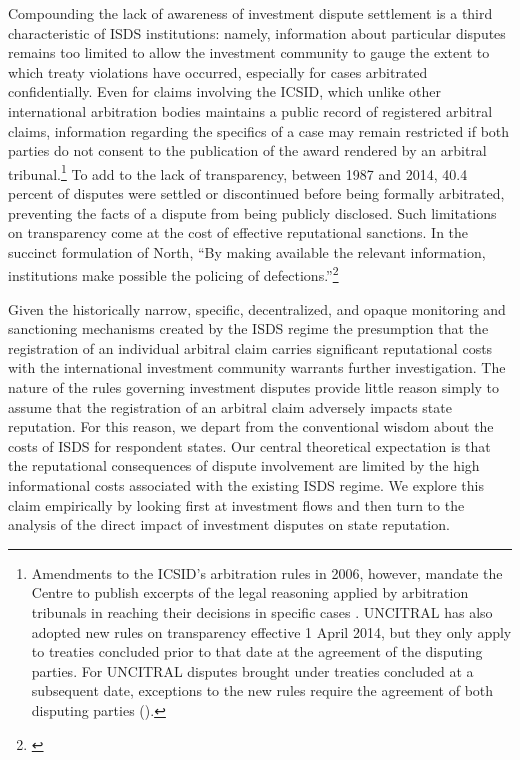 \documentclass[12pt,onesided]{amsart}
\begin{document}
Compounding the lack of awareness of investment dispute settlement is a third characteristic of ISDS institutions: namely, information about particular disputes remains too limited to allow the investment community to gauge the extent to which treaty violations have occurred, especially for cases arbitrated confidentially. Even for claims involving the ICSID, which unlike other international arbitration bodies maintains a public record of registered arbitral claims, information regarding the specifics of a case may remain restricted if both parties do not consent to the publication of the award rendered by an arbitral tribunal.\footnote{Amendments to the ICSID's arbitration rules in 2006, however, mandate the Centre to publish excerpts of the legal reasoning applied by arbitration tribunals in reaching their decisions in specific cases \citep{antonietti:2006}. UNCITRAL has also adopted new rules on transparency effective 1 April 2014, but they only apply to treaties concluded prior to that date at the agreement of the disputing parties. For UNCITRAL disputes brought under treaties concluded at a subsequent date, exceptions to the new rules require the agreement of both disputing parties (\citealp[33--40]{uncitral:2013}).} To add to the lack of transparency, between 1987 and 2014, 40.4 percent of disputes were settled or discontinued before being formally arbitrated, preventing the facts of a dispute from being publicly disclosed. Such limitations on transparency come at the cost of effective reputational sanctions. In the succinct formulation of North, ``By making available the relevant information, institutions make possible the policing of defections.''\footnote{\citet[57]{north1990institutions}} 

Given the historically narrow, specific, decentralized, and opaque monitoring and sanctioning mechanisms created by the ISDS regime the presumption that the registration of an individual arbitral claim carries significant reputational costs with the international investment community warrants further investigation. The nature of the rules governing investment disputes provide little reason simply to assume that the registration of an arbitral claim adversely impacts state reputation. For this reason, we depart from the conventional wisdom about the costs of ISDS for respondent states. Our central theoretical expectation is that the reputational consequences of dispute involvement are limited by the high informational costs associated with the existing ISDS regime. We explore this claim empirically by looking first at investment flows and then turn to the analysis of the direct impact of investment disputes on state reputation. 
\end{document}
